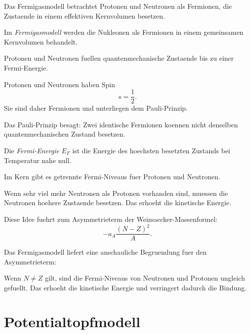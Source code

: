 Das Fermigasmodell betrachtet Protonen und Neutronen als Fermionen, die Zustaende
in einem effektiven Kernvolumen besetzen.

\begin{definitionbox}
Im \emph{Fermigasmodell} werden die Nukleonen als Fermionen in einem gemeinsamen
Kernvolumen behandelt.

Protonen und Neutronen fuellen quantenmechanische Zustaende bis zu einer
Fermi-Energie.
\end{definitionbox}

\begin{conceptbox}
Protonen und Neutronen haben Spin
\begin{equation*}
    s=\frac{1}{2}.
\end{equation*}
Sie sind daher Fermionen und unterliegen dem Pauli-Prinzip.

Das Pauli-Prinzip besagt:
Zwei identische Fermionen koennen nicht denselben quantenmechanischen Zustand besetzen.
\end{conceptbox}

\begin{definitionbox}
Die \emph{Fermi-Energie} $E_F$ ist die Energie des hoechsten besetzten Zustands
bei Temperatur nahe null.
\end{definitionbox}

\begin{conceptbox}
Im Kern gibt es getrennte Fermi-Niveaus fuer Protonen und Neutronen.

Wenn sehr viel mehr Neutronen als Protonen vorhanden sind, muessen die Neutronen
hoehere Zustaende besetzen.
Das erhoeht die kinetische Energie.

Diese Idee fuehrt zum Asymmetrieterm der Weizsaecker-Massenformel:
\begin{equation*}
    -a_A\frac{(N-Z)^2}{A}.
\end{equation*}
\end{conceptbox}

\begin{examtipbox}
Das Fermigasmodell liefert eine anschauliche Begruendung fuer den Asymmetrieterm:

Wenn $N\neq Z$ gilt, sind die Fermi-Niveaus von Neutronen und Protonen ungleich
gefuellt.
Das erhoeht die kinetische Energie und verringert dadurch die Bindung.
\end{examtipbox}

\section{Potentialtopfmodell}

